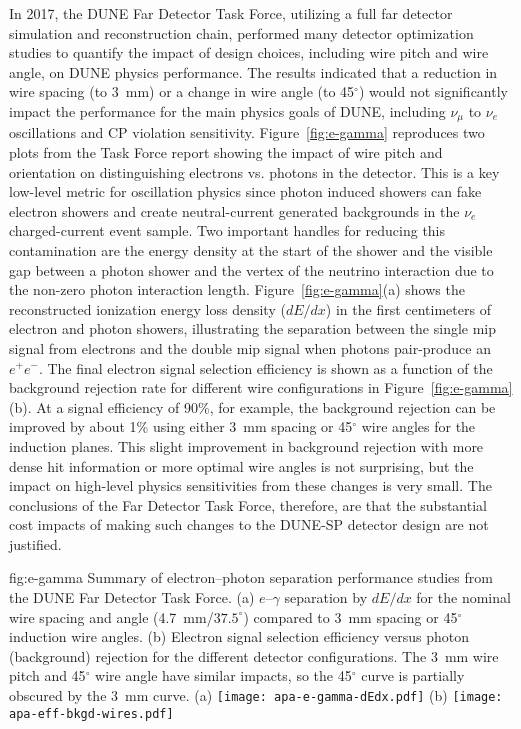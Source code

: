 \begin{itemize}
In 2017, the DUNE Far Detector Task Force, utilizing a full far detector simulation and reconstruction chain, performed many detector optimization studies to quantify the impact of design choices, including wire pitch and wire angle, on DUNE physics performance.  The results indicated that a reduction in wire spacing (to \SI{3}{mm}) or a change in wire angle (to 45$^\circ$) would not significantly impact the performance for the main physics goals of DUNE, including $\nu_\mu $ to $\nu_e$ oscillations and CP violation sensitivity.  Figure~\ref{fig:e-gamma} reproduces two plots from the Task Force report showing the impact of wire pitch and orientation on distinguishing electrons vs. photons in the detector.  This is a key low-level metric for oscillation physics since photon induced showers can fake electron showers and create neutral-current generated backgrounds in the $\nu_e$ charged-current event sample. Two important handles for reducing this contamination are the energy density at the start of the shower and the visible gap between a photon shower and the vertex of the neutrino interaction due to the non-zero photon interaction length.  Figure~\ref{fig:e-gamma}(a) shows the reconstructed ionization energy loss density ($dE/dx$) in the first centimeters of electron and photon showers, illustrating the separation between the single mip signal from electrons and the double mip signal when photons pair-produce an $e^+e^-$.  The final electron signal selection efficiency is shown as a function of the background rejection rate for different wire configurations in Figure~\ref{fig:e-gamma}(b). At a signal efficiency of 90\%, for example, the background rejection can be improved by about 1\% using either \SI{3}{mm} spacing or 45$^\circ$ wire angles for the induction planes.  This slight improvement in background rejection with more dense hit information or more optimal wire angles is not surprising, but the impact on high-level physics sensitivities from these changes is very small. The conclusions of the Far Detector Task Force, therefore, are that the substantial cost impacts of making such changes to the DUNE-SP detector design are not justified.        

\begin{dunefigure}{fig:e-gamma}
{Summary of electron--photon separation performance studies from the DUNE Far Detector Task Force. (a) $e$--$\gamma$ separation by $dE/dx$ for the nominal wire spacing and angle (\SI{4.7}{mm}/$37.5^\circ$) compared to \SI{3}{mm} spacing or 45$^\circ$ induction wire angles. (b) Electron signal selection efficiency versus photon (background) rejection for the different detector configurations. The \SI{3}{mm} wire pitch and 45$^\circ$ wire angle have similar impacts, so the 45$^\circ$ curve is partially obscured by the \SI{3}{mm} curve.}
(a)
\texttt{[image: apa-e-gamma-dEdx.pdf]} \qquad
(b)
\texttt{[image: apa-eff-bkgd-wires.pdf]} 
\end{dunefigure}


\end{itemize}
